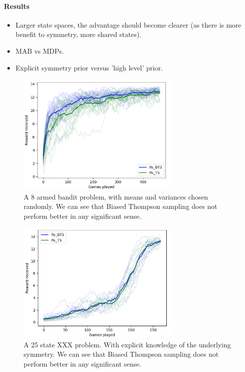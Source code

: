 \paragraph{Results}

\begin{itemize}
	\item Larger state spaces, the advantage should become clearer (as there is more benefit to symmetry, more shared states).
	\item MAB vs MDPs.
	\item Explicit symmetry prior versus 'high level' prior.
\end{itemize}


\begin{figure}[h!]
  \centering
  \includegraphics[width=0.7\textwidth,height=0.35\textheight]{../../pictures/figures/mab-9-ts.png}
  \caption{A 8 armed bandit problem, with means and variances chosen randomly.
	We can see that Biased Thompson sampling does not perform better in any significant sense.}
\end{figure}

\begin{figure}[h!]
  \centering
  \includegraphics[width=0.7\textwidth,height=0.35\textheight]{../../pictures/figures/mdp-25-explicit.png}
  \caption{A 25 state XXX problem. With explicit knowledge of the underlying symmetry.
	We can see that Biased Thompson sampling does not perform better in any significant sense.}
\end{figure}

